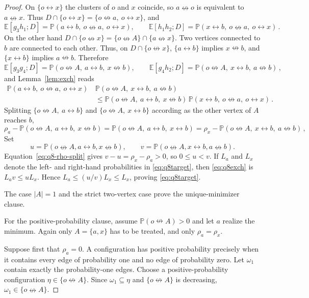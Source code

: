 \documentclass[11pt]{article}
\theoremstyle{definition}
\theoremstyle{remark}
\newcommand{\PP}{\mathbb P}
\newcommand{\EE}{\mathbb E}
\newcommand{\con}{\leftrightarrow}
\newcommand{\ncon}{\nleftrightarrow}
\begin{document}
\begin{proof}
On $\{o\con x\}$ the clusters of $o$ and $x$ coincide, so $a\ncon o$ is equivalent to
$a\ncon x$. Thus $D\cap\{o\con x\}=\{o\ncon a,\ o\con x\}$, and
\[
 \EE[g_3h_1;D]=\PP(a\con b,\ o\ncon a,\ o\con x),\qquad
 \EE[h_1h_2;D]=\PP(x\con b,\ o\ncon a,\ o\con x)\,.
\]
On the other hand $D\cap\{o\ncon x\}=\{o\ncon A\}\cap\{a\ncon x\}$. Two vertices connected
to $b$ are connected to each other. Thus, on $D\cap\{o\ncon x\}$, $\{a\con b\}$ implies $x\ncon b$, and
$\{x\con b\}$ implies $a\ncon b$. Therefore
\[
 \EE[g_3g_4;D]=\PP(o\ncon A,\ a\con b,\ x\ncon b),\qquad
 \EE[g_4h_2;D]=\PP(o\ncon A,\ x\con b,\ a\ncon b)\,,
\]
and Lemma~\ref{lem:exch} reads
\begin{equation}\label{eq:q8exch}
\begin{split}
 \PP(a\con b,\ o\ncon a,\ o\con x)\,&\PP(o\ncon A,\ x\con b,\ a\ncon b)\\
 &\leq \PP(o\ncon A,\ a\con b,\ x\ncon b)\,\PP(x\con b,\ o\ncon a,\ o\con x)\,.
\end{split}
\end{equation}
Splitting $\{o\ncon A,\ a\con b\}$ and $\{o\ncon A,\ x\con b\}$ according as the other
vertex of $A$ reaches $b$,
\begin{equation}\label{eq:q8-rho-split}
 \rho_a-\PP(o\ncon A,\ a\con b,\ x\ncon b)
 =\PP(o\ncon A,\ a\con b,\ x\con b)
 =\rho_x-\PP(o\ncon A,\ x\con b,\ a\ncon b)\,,
\end{equation}
Set
\[
 u=\PP(o\ncon A,a\con b,x\ncon b),\qquad
 v=\PP(o\ncon A,x\con b,a\ncon b).
\]
Equation~\eqref{eq:q8-rho-split} gives $v-u=\rho_x-\rho_a>0$, so $0\leq u<v$. If $L_a$ and $L_x$
denote the left- and right-hand probabilities in \eqref{eq:q8target}, then
\eqref{eq:q8exch} is $L_av\leq uL_x$. Hence
$L_a\leq(u/v)L_x\leq L_x$, proving \eqref{eq:q8target}.

The case $|A|=1$ and the strict two-vertex case prove the unique-minimizer clause.

For the positive-probability clause, assume $\PP(o\ncon A)>0$ and let $a$ realize the minimum. Again
only $A=\{a,x\}$ has to be treated, and only $\rho_a=\rho_x$.

Suppose first that $\rho_a=0$. A configuration has positive probability precisely when it
contains every edge of probability one and no edge of probability zero. Let $\omega_1$
contain exactly the probability-one edges. Choose a positive-probability configuration
$\eta\in\{o\ncon A\}$. Since $\omega_1\subseteq\eta$ and $\{o\ncon A\}$ is decreasing,
$\omega_1\in\{o\ncon A\}$.


\end{proof}
\end{document}
